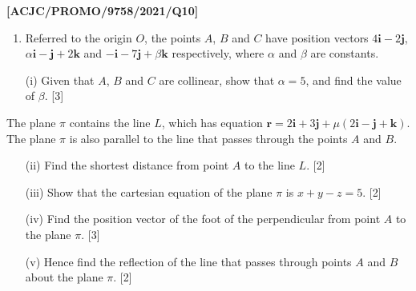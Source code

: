 \item \textbf{{[}ACJC/PROMO/9758/2021/Q10{]}}
\begin{enumerate}
\item Referred to the origin $O$, the points $A$, $B$ and $C$ have position
vectors $4\mathbf{i}-2\mathbf{j}$, $\alpha\mathbf{i}-\mathbf{j}+2\mathbf{k}$
and $-\mathbf{i}-7\mathbf{j}+\beta\mathbf{k}$ respectively, where
$\alpha$ and $\beta$ are constants. 
\item[(i)]  Given that $A$, $B$ and $C$ are collinear, show that $\alpha=5$,
and find the value of $\beta$. \hfill{}{[}3{]}
\end{enumerate}
The plane $\pi$ contains the line $L$, which has equation $\mathbf{r}=2\mathbf{i}+3\mathbf{j}+\mu(2\mathbf{i}-\mathbf{j}+\mathbf{k}).$
The plane $\pi$ is also parallel to the line that passes through
the points $A$ and $B$. 
\begin{enumerate}
\item[(ii)]  Find the shortest distance from point $A$ to the line $L$. \hfill{}{[}2{]}
\item[(iii)]  Show that the cartesian equation of the plane $\pi$ is $x+y-z=5$.
\hfill{}{[}2{]}
\item[(iv)]  Find the position vector of the foot of the perpendicular from point
$A$ to the plane $\pi$. \hfill{}{[}3{]}
\item[(v)]  Hence find the reflection of the line that passes through points
$A$ and $B$ about the plane $\pi$. \hfill{}{[}2{]}
\end{enumerate}